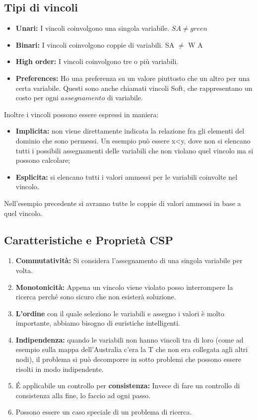 \subsection{Tipi di vincoli}
\begin{itemize}
    \item \textbf{Unari:} I vincoli coinvolgono una singola variabile. $SA \neq
              green$
    \item \textbf{Binari:} I vincoli coinvolgono coppie di variabili. SA $\neq$
          W A
    \item \textbf{High order:} I vincoli coinvolgono tre o più variabili.
    \item \textbf{Preferences:} Ho una preferenza su un valore piuttosto che un
          altro per una certa variabile. Questi sono anche chiamati vincoli Soft, che
          rappresentano un costo per ogni $assegnamento$ di variabile.
\end{itemize}
Inoltre i vincoli possono essere espressi in maniera:
\begin{itemize}
    \item \textbf{Implicita:} non viene direttamente indicata la relazione fra
          gli elementi del dominio che sono permessi. Un esempio può essere x<y, dove
          non si elencano tutti i possibili assegnamenti delle variabili che non
          violano quel vincolo ma si possono calcolare;
    \item \textbf{Esplicita:} si elencano tutti i valori ammessi per le
          variabili coinvolte nel vincolo.
\end{itemize}
Nell'esempio precedente si avranno tutte le coppie di valori ammessi in base a
quel vincolo.

\subsection{Caratteristiche e Proprietà CSP}
\begin{enumerate}
    \item \textbf{Commutatività:} Si considera l'assegnamento di una singola
          variabile per volta.
    \item \textbf{Monotonicità:} Appena un vincolo viene violato posso
          interrompere la ricerca perché sono sicuro che non esisterà soluzione.
    \item \textbf{L'ordine} con il quale seleziono le variabili e assegno i
          valori è molto importante, abbiamo bisogno di euristiche intelligenti.
    \item \textbf{Indipendenza:} quando le variabili non hanno vincoli tra di
          loro (come ad esempio sulla mappa dell'Australia c'era la T che non era
          collegata agli altri nodi), il problema si può decomporre in sotto problemi
          che possono essere risolti in modo indipendente.
    \item É applicabile un controllo per \textbf{consistenza:} Invece di fare un
          controllo di consistenza alla fine, lo faccio ad ogni passo.
    \item Possono essere un caso speciale di un problema di ricerca.
\end{enumerate}
